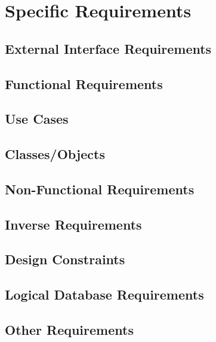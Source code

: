 
\section{Specific Requirements}

	\subsection{External Interface Requirements}
		

	\subsection{Functional Requirements}
		

	\subsection{Use Cases}
		

	\subsection{Classes/Objects}
		

	\subsection{Non-Functional Requirements}
		

	\subsection{Inverse Requirements}


	\subsection{Design Constraints}


	\subsection{Logical Database Requirements}


	\subsection{Other Requirements}